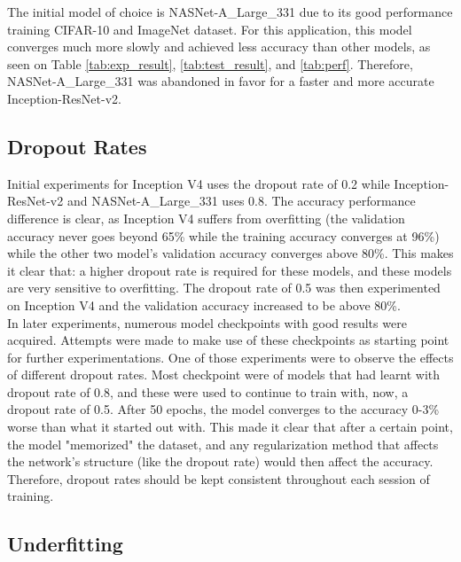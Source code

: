 \documentclass[a4paper]{article}
\begin{document}
The initial model of choice is NASNet-A\_Large\_331 due to its good performance training CIFAR-10 and ImageNet dataset. For this application, this model converges much more slowly and achieved less accuracy than other models, as seen on Table \ref{tab:exp_result}, \ref{tab:test_result}, and \ref{tab:perf}. Therefore, NASNet-A\_Large\_331 was abandoned in favor for a faster and more accurate Inception-ResNet-v2.

\subsection{Dropout Rates}

Initial experiments for Inception V4 uses the dropout rate of 0.2 while Inception-ResNet-v2 and NASNet-A\_Large\_331 uses 0.8. The accuracy performance difference is clear, as Inception V4 suffers from overfitting (the validation accuracy never goes beyond 65\% while the training accuracy converges at 96\%) while the other two model's validation accuracy converges above 80\%. This makes it clear that: a higher dropout rate is required for these models, and these models are very sensitive to overfitting. The dropout rate of 0.5 was then experimented on Inception V4 and the validation accuracy increased to be above 80\%. \\

In later experiments, numerous model checkpoints with good results were acquired. Attempts were made to make use of these checkpoints as starting point for further experimentations. One of those experiments were to observe the effects of different dropout rates. Most checkpoint were of models that had learnt with dropout rate of 0.8, and these were used to continue to train with, now, a dropout rate of 0.5. After 50 epochs, the model converges to the accuracy 0-3\% worse than what it started out with. This made it clear that after a certain point, the model "memorized" the dataset, and any regularization method that affects the network's structure (like the dropout rate) would then affect the accuracy. Therefore, dropout rates should be kept consistent throughout each session of training.

\subsection{Underfitting}
\end{document}
